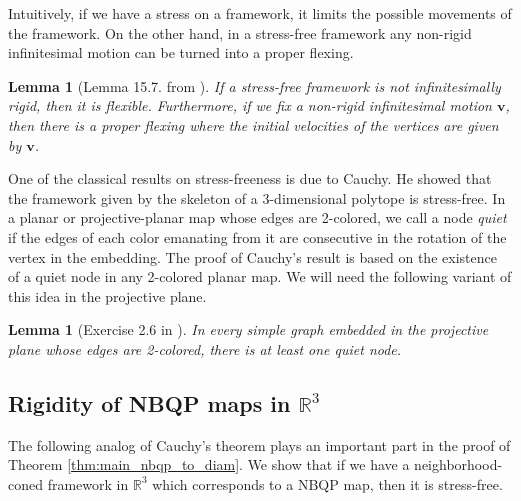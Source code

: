 \documentclass[10pt,a4paper]{article}
\newtheorem{lemma}[theorem]{Lemma}
\newcommand{\vv}[0]{\mathbf{v}}
\newcommand{\R}[0]{\mathbb{R}}
\begin{document}
 


Intuitively, if we have a stress on a framework, it limits the possible movements of the framework. On the other hand, in a stress-free framework any non-rigid infinitesimal motion can be turned into a proper flexing. 

    \begin{lemma}[Lemma 15.7. from \cite{lovasz2019graphs}]\label{lem:flexing}
        If a stress-free framework is not infinitesimally rigid, then it is flexible. Furthermore, if we fix a non-rigid infinitesimal motion $\vv$, then there is a proper flexing where the initial velocities of the vertices are given by $\vv$.
    \end{lemma}







One of the classical results on stress-freeness is due to Cauchy. He showed that the framework given by the skeleton of a 3-dimensional polytope is stress-free. In a planar or projective-planar map whose edges are 2-colored, we call a node \emph{quiet} if the edges of each color emanating from it are consecutive in the rotation of the vertex in the embedding. The proof of Cauchy's result is based on the existence of a quiet node in any 2-colored planar map. We will need the following variant of this idea in the projective plane. 

\begin{lemma}[Exercise 2.6 in \cite{lovasz2019graphs}]\label{lemma:quiet}
    In every simple graph embedded in the projective plane whose edges are 2-colored, there is at least one quiet node.
\end{lemma}

\subsection{Rigidity of NBQP maps in $\R^3$}



The following analog of Cauchy's theorem plays an important part in the proof of Theorem \ref{thm:main_nbqp_to_diam}.  We show that if we have a neighborhood-coned framework in $\R^3$ which corresponds to a NBQP map, then it is stress-free. 
\end{document}
